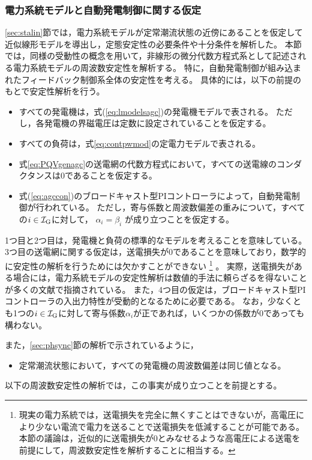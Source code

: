 \documentclass[tombow,dvipdfmx]{corona-a5-1.1}
\begin{document}
\subsubsection{電力系統モデルと自動発電制御に関する仮定}

\ref{sec:stalin}節では，電力系統モデルが定常潮流状態の近傍にあることを仮定して近似線形モデルを導出し，定態安定性の必要条件や十分条件を解析した。
本節では，同様の受動性の概念を用いて，非線形の微分代数方程式系として記述される電力系統モデルの周波数安定性を解析する。
特に，自動発電制御が組み込まれたフィードバック制御系全体の安定性を考える。
具体的には，以下の前提のもとで安定性解析を行う。
\begin{itemize}
\item すべての発電機は，式(\ref{eq:lmodelsagc})の発電機モデルで表される。
ただし，各発電機の界磁電圧は定数に設定されていることを仮定する。
\item すべての負荷は，式\ref{eq:contpwmod}の定電力モデルで表される。
\item 式\ref{eq:PQVgenagc}の送電網の代数方程式において，すべての送電線のコンダクタンスは0であることを仮定する。
\item 式(\ref{eq:agccon})のブロードキャスト型PIコントローラによって，自動発電制御が行われている。
ただし，寄与係数と周波数偏差の重みについて，すべての$i\in \mathcal{I}_{\rm G}$に対して，
$\alpha_i = \beta_i $
が成り立つことを仮定する。
\end{itemize}

1つ目と2つ目は，発電機と負荷の標準的なモデルを考えることを意味している。
3つ目の送電網に関する仮定は，送電損失が0であることを意味しており，数学的に安定性の解析を行うためには欠かすことができない
\footnote{
現実の電力系統では，送電損失を完全に無くすことはできないが，高電圧により少ない電流で電力を送ることで送電損失を低減することが可能である。
本節の議論は，近似的に送電損失が0とみなせるような高電圧による送電を前提にして，周波数安定性を解析することに相当する。
}
。
実際，送電損失がある場合には，電力系統モデルの安定性解析は数値的手法に頼らざるを得ないことが多くの文献で指摘されている\cite{narasimhamurthi1984existence,chang1995direct,chiang2011direct,yang2019distributed}。
また，4つ目の仮定は，ブロードキャスト型PIコントローラの入出力特性が受動的となるために必要である。
なお，少なくとも1つの$i\in \mathcal{I}_{\rm G}$に対して寄与係数$\alpha_i$が正であれば，いくつかの係数が0であっても構わない。


また，\ref{sec:phsync}節の解析で示されているように，
\begin{itemize}
\item 定常潮流状態において，すべての発電機の周波数偏差は同じ値となる。
\end{itemize}
以下の周波数安定性の解析では，この事実が成り立つことを前提とする。
\end{document}
